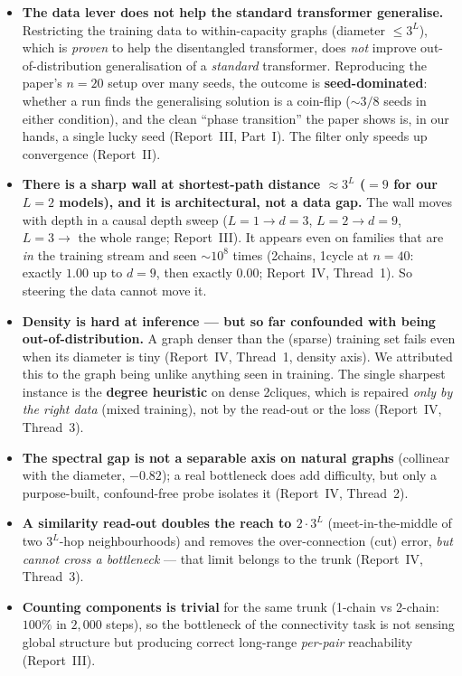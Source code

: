 \documentclass[11pt,a4paper]{article}
\begin{document}
\begin{itemize}\setlength\itemsep{0.25em}
  \item \textbf{The data lever does not help the standard transformer generalise.} Restricting
        the training data to within-capacity graphs (diameter $\le 3^L$), which is \emph{proven}
        to help the disentangled transformer, does \emph{not} improve out-of-distribution
        generalisation of a \emph{standard} transformer. Reproducing the paper's $n=20$ setup
        over many seeds, the outcome is \textbf{seed-dominated}: whether a run finds the
        generalising solution is a coin-flip ($\sim 3/8$ seeds in either condition), and the
        clean ``phase transition'' the paper shows is, in our hands, a single lucky seed
        (Report~III, Part~I). The filter only speeds up convergence (Report~II).
  \item \textbf{There is a sharp wall at shortest-path distance $\approx 3^L$ ($=9$ for our
        $L=2$ models), and it is architectural, not a data gap.} The wall moves with depth in a
        causal depth sweep ($L=1\to d{=}3$, $L=2\to d{=}9$, $L=3\to$ the whole range;
        Report~III). It appears even on families that are \emph{in} the training stream and seen
        $\sim 10^8$ times (2chains, 1cycle at $n=40$: exactly $1.00$ up to $d=9$, then exactly
        $0.00$; Report~IV, Thread~1). So steering the data cannot move it.
  \item \textbf{Density is hard at inference --- but so far confounded with being
        out-of-distribution.} A graph denser than the (sparse) training set fails even when its
        diameter is tiny (Report~IV, Thread~1, density axis). We attributed this to the graph
        being unlike anything seen in training. The single sharpest instance is the
        \textbf{degree heuristic} on dense 2cliques, which is repaired \emph{only by the right
        data} (mixed training), not by the read-out or the loss (Report~IV, Thread~3).
  \item \textbf{The spectral gap is not a separable axis on natural graphs}
        (collinear with the diameter, $-0.82$); a real bottleneck does add difficulty, but only
        a purpose-built, confound-free probe isolates it (Report~IV, Thread~2).
  \item \textbf{A similarity read-out doubles the reach to $2\cdot 3^L$} (meet-in-the-middle of
        two $3^L$-hop neighbourhoods) and removes the over-connection (cut) error, \emph{but
        cannot cross a bottleneck} --- that limit belongs to the trunk (Report~IV, Thread~3).
  \item \textbf{Counting components is trivial} for the same trunk (1-chain vs 2-chain: $100\%$
        in $2{,}000$ steps), so the bottleneck of the connectivity task is not sensing global
        structure but producing correct long-range \emph{per-pair} reachability (Report~III).
\end{itemize}
\end{document}
